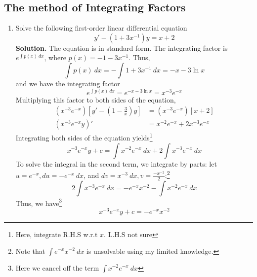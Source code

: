 \documentclass[a4paper]{article}
\begin{document}
\subsection{The method of Integrating Factors}
\begin{enumerate}
    \item Solve the following first-order linear differential equation
    \begin{equation}
        y'-(1+3x^{-1})y=x+2
    \end{equation}
    \textbf{Solution.} The equation is in standard form. The integrating factor is $e^{\int p(x)~dx}$, where $p(x)=-1-3x^{-1}$. Thus,
    \begin{equation*}
        \int p(x)~dx=-\int 1+3x^{-1}~dx=-x-3\ln x
    \end{equation*}
    and we have the integrating factor
    \begin{equation*}
        e^{\int p(x)~dx}=e^{-x-3\ln x}=x^{-3}e^{-x}
    \end{equation*}
    Multiplying this factor to both sides of the equation,
    \begin{align*}
        (x^{-3}e^{-x})[y'-(1-\frac{3}{x})y]&=(x^{-3}e^{-x})[x+2] \\
        (x^{-3}e^{-x}y)'&=x^{-2}e^{-x}+2x^{-3}e^{-x}
    \end{align*}
    Integrating both sides of the equation yields\footnote{Here, integrate R.H.S w.r.t $x$. L.H.S not sure}
    \begin{equation*}
        x^{-3}e^{-x}y+c=\int x^{-2}e^{-x}~dx+2\int x^{-3}e^{-x}~dx
    \end{equation*}
    To solve the integral in the second term, we integrate by parts: let $u=e^{-x},du=-e^{-x}~dx$, and $dv=x^{-3}~dx, v=\frac{-x^{-2}}{2}$:\footnote{Note that $\int e^{-x}x^{-2}~dx$ is unsolvable using my limited knowledge.} 
    \begin{equation*}
        2\int x^{-3}e^{-x}~dx=-e^{-x}x^{-2}-\int x^{-2}e^{-x}~dx
    \end{equation*}
    Thus, we have\footnote{Here we cancel off the term $\int x^{-2}e^{-x}~dx$}
    \begin{equation*}
        x^{-3}e^{-x}y+c=-e^{-x}x^{-2}
    \end{equation*}
\end{enumerate}
\end{document}
